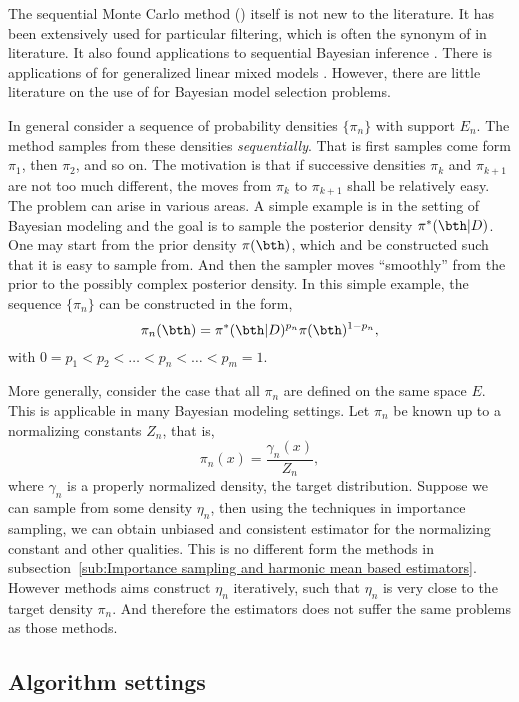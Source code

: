 The sequential Monte Carlo method (\smc) itself is not new to the literature. It has been extensively used for
particular filtering, which is often the synonym of \smc in literature. It also found applications to sequential
Bayesian inference \parencite{Douc2005}. There is applications of \smc for generalized linear mixed models
\parencite{Fan2008}. However, there are little literature on the use of \smc for Bayesian model selection problems.

In general consider a sequence of probability densities $\{\pi_n\}$ with support $E_n$. The \smc method samples
from these densities \emph{sequentially}. That is first samples come form $\pi_1$, then $\pi_2$, and so on. The
motivation is that if successive densities $\pi_k$ and $\pi_{k+1}$ are not too much different, the moves from
$\pi_k$ to $\pi_{k+1}$ shall be relatively easy. The problem can arise in various areas. A simple example is in the
setting of Bayesian modeling and the goal is to sample the posterior density $\pi^*(\bth|D)$. One may start from
the prior density $\pi(\bth)$, which and be constructed such that it is easy to sample from. And then the sampler
moves ``smoothly'' from the prior to the possibly complex posterior density. In this simple example, the sequence
$\{\pi_n\}$ can be constructed in the form,
\begin{equation}
  \pi_n(\bth) = \pi^*(\bth|D)^{p_n} \pi(\bth)^{1-p_n},
\end{equation}
with $0 = p_1 < p_2 < \dots < p_n < \dots < p_m = 1$.

More generally, consider the case that all $\pi_n$ are defined on the same space $E$. This is applicable in many
Bayesian modeling settings. Let $\pi_n$ be known up to a normalizing constants $Z_n$, that is,
\begin{equation}
  \pi_n(x) = \frac{\gamma_n(x)}{Z_n},
\end{equation}
where $\gamma_n$ is a properly normalized density, the target distribution. Suppose we can sample from some density
$\eta_n$, then using the techniques in importance sampling, we can obtain unbiased and consistent estimator for the
normalizing constant and other qualities. This is no different form the methods in subsection~\ref{sub:Importance
  sampling and harmonic mean based estimators}. However \smc methods aims construct $\eta_n$ iteratively, such that
$\eta_n$ is very close to the target density $\pi_n$. And therefore the estimators does not suffer the same
problems as those methods.

\subsection{Algorithm settings}
\label{sub:Algorithm settings}

